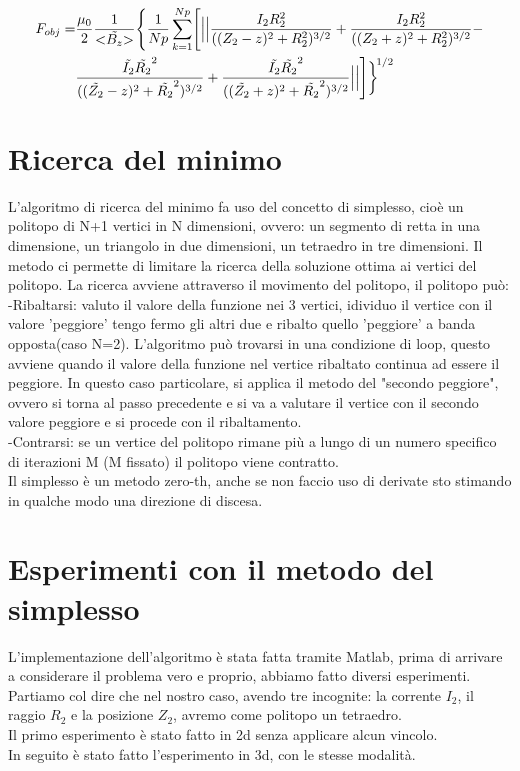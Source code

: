 \documentclass[a4paper, 11pt]{article}
\begin{document}
\begin{equation}
	\begin{split}
		F_{obj} =
		& \frac{\mu_{0}}{2} \frac{1}{{\tiny <} \tilde{B_{z}}{\tiny >}} \Biggl\{ \frac{1}{Np} \sum\limits_{k=1}^{Np} \Biggl[\Bigl|\Bigl|\frac{I_{2}R_{2}^{2}}{((Z_{2}-z)^{2}+R_{2}^{2})^{3/2}}+\frac{I_{2}R_{2}^{2}}{((Z_{2}+z)^{2}+R_{2}^{2})^{3/2}}- \\
		& \frac{\tilde{I_{2}}\tilde{R_{2}}^{2}}{((\tilde{Z_{2}}-z)^{2}+\tilde{R_{2}}^{2})^{3/2}}+\frac{\tilde{I_{2}}\tilde{R_{2}}^{2}}{((\tilde{Z_{2}}+z)^{2}+\tilde{R_{2}}^{2})^{3/2}}\Bigr|\Bigr|\Biggr]\biggr\}^{\!1/2}
	\end{split} 
\end{equation}
\noindent
 

\section* {Ricerca del minimo}

L'algoritmo di ricerca del minimo fa uso del concetto di simplesso, cioè un politopo di N+1 vertici 
in N dimensioni, ovvero: un segmento di retta in una dimensione, un triangolo in due 
dimensioni, un tetraedro in tre dimensioni. Il metodo ci permette di limitare la
ricerca della soluzione ottima ai vertici del politopo. La ricerca avviene 
attraverso il movimento del politopo, il politopo può:\\   
-Ribaltarsi:    valuto il valore della funzione nei 3 vertici, idividuo il vertice
	con il valore 'peggiore' tengo fermo gli altri due e ribalto quello 
	'peggiore' a banda opposta(caso N=2). L'algoritmo può trovarsi in una
	condizione di loop, questo avviene quando il valore della funzione nel vertice ribaltato continua ad
	essere il peggiore. In questo caso particolare, si applica il metodo
	del "secondo peggiore", ovvero si torna al passo precedente e si va a
	valutare il vertice con il secondo valore peggiore e si procede con il
	ribaltamento. \\
-Contrarsi:     se un vertice del politopo rimane più a lungo di un numero 
	specifico di iterazioni M (M fissato) il politopo viene contratto.\\
Il simplesso è un metodo zero-th, anche se non faccio uso di derivate sto stimando in qualche
modo una direzione di discesa. \\

\section* {Esperimenti con il metodo del simplesso}
L'implementazione dell'algoritmo è stata fatta tramite Matlab, prima di arrivare
a considerare il problema vero e proprio, abbiamo fatto diversi esperimenti.
Partiamo col dire che nel nostro caso, avendo tre incognite: la corrente $I_{2}$, il raggio $R_{2}$ e
la posizione $Z_{2}$, avremo come politopo un tetraedro.\\
Il primo esperimento è stato fatto in 2d senza applicare alcun vincolo. 
\\
In seguito è stato fatto l'esperimento in 3d, con le stesse modalità.

\begin{thebibliography}{9}
\end{thebibliography}
\end{document}
